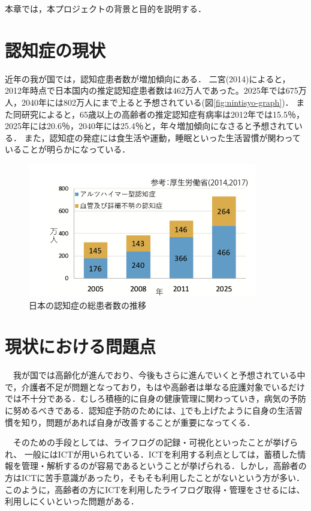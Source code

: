 \documentclass[../report]{subfiles}
\begin{document}
本章では，本プロジェクトの背景と目的を説明する．

\section{認知症の現状} \label{sec:genzyou}
近年の我が国では，認知症患者数が増加傾向にある．
二宮(2014)によると，2012年時点で日本国内の推定認知症患者数は462万人であった\cite{syourai}。2025年では675万人，2040年には802万人にまで上ると予想されている(図\ref{fig:nintisyo-graph})．
また同研究によると，65歳以上の高齢者の推定認知症有病率は2012年では15.5％，2025年には20.6％，2040年には25.4％と，年々増加傾向になさると予想されている\cite{syourai}．
また，認知症の発症には食生活や運動，睡眠といった生活習慣が関わっていることが明らかになっている\cite{seikatsu}．
\begin{figure}[htbp]
    \begin{center}
        \includegraphics[width=10cm]{imgs/ninchisyo-graph.png}
        \caption{日本の認知症の総患者数の推移}
        \label{fig:ninchisyo-graph}
    \end{center}
\end{figure}

\section{現状における問題点} \label{sec:mondai}
　我が国では高齢化が進んでおり、今後もさらに進んでいくと予想されている中で，介護者不足が問題となっており，もはや高齢者は単なる庇護対象でいるだけでは不十分である\cite{kaigo}．むしろ積極的に自身の健康管理に関わっていき，病気の予防に努めるべきである．認知症予防のためには、\ref{sec:genzyou}でも上げたように自身の生活習慣を知り，問題があれば自身が改善することが重要になってくる．

　そのための手段としては、ライフログの記録・可視化といったことが挙げられ\cite{lifelog}、 一般にはICTが用いられている．ICTを利用する利点としては，蓄積した情報を管理・解析するのが容易であるということが挙げられる．しかし，高齢者の方はICTに苦手意識があったり，そもそも利用したことがないという方が多い．このように，高齢者の方にICTを利用したライフログ取得・管理をさせるには、利用しにくいといった問題がある．
\end{document}
